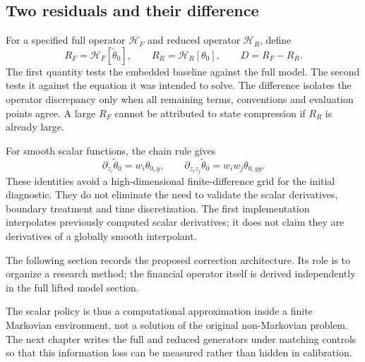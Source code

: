 \subsection{Two residuals and their difference}
For a specified full operator $\mathcal H_F$ and reduced operator $\mathcal H_R$, define
\[
 R_F=\mathcal H_F[\widetilde\theta_0],\qquad
 R_R=\mathcal H_R[\theta_0],\qquad D=R_F-R_R.
\]
The first quantity tests the embedded baseline against the full model. The second tests it against the equation it was intended to solve. The difference isolates the operator discrepancy only when all remaining terms, conventions and evaluation points agree. A large $R_F$ cannot be attributed to state compression if $R_R$ is already large.

For smooth scalar functions, the chain rule gives
\[
 \partial_{z_i}\widetilde\theta_0=w_i\theta_{0,y},\qquad
 \partial_{z_i z_j}\widetilde\theta_0=w_iw_j\theta_{0,yy}.
\]
These identities avoid a high-dimensional finite-difference grid for the initial diagnostic. They do not eliminate the need to validate the scalar derivatives, boundary treatment and time discretization. The first implementation interpolates previously computed scalar derivatives; it does not claim they are derivatives of a globally smooth interpolant.

The following section records the proposed correction architecture. Its role is to organize a research method; the financial operator itself is derived independently in the full lifted model section.

The scalar policy is thus a computational approximation inside a finite Markovian environment, not a solution of the original non-Markovian problem. The next chapter writes the full and reduced generators under matching controls so that this information loss can be measured rather than hidden in calibration.
